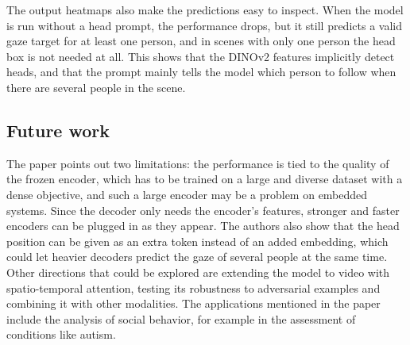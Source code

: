 \documentclass[12pt]{article}
\begin{document}
\vspace{0.5cm}

The output heatmaps also make the predictions easy to inspect. When the model is run without a head prompt, the performance drops, but it still predicts a valid gaze target for at least one person, and in scenes with only one person the head box is not needed at all.
This shows that the DINOv2 features implicitly detect heads, and that the prompt mainly tells the model which person to follow when there are several people in the scene.

\vspace{0.5cm}

\subsection*{Future work}

The paper points out two limitations: the performance is tied to the quality of the frozen encoder, which has to be trained on a large and diverse dataset with a dense objective, and such a large encoder may be a problem on embedded systems.
Since the decoder only needs the encoder's features, stronger and faster encoders can be plugged in as they appear. The authors also show that the head position can be given as an extra token instead of an added embedding, which could let heavier decoders predict the gaze of several people at the same time.
Other directions that could be explored are extending the model to video with spatio-temporal attention, testing its robustness to adversarial examples and combining it with other modalities. The applications mentioned in the paper include the analysis of social behavior, for example in the assessment of conditions like autism.
\end{document}
